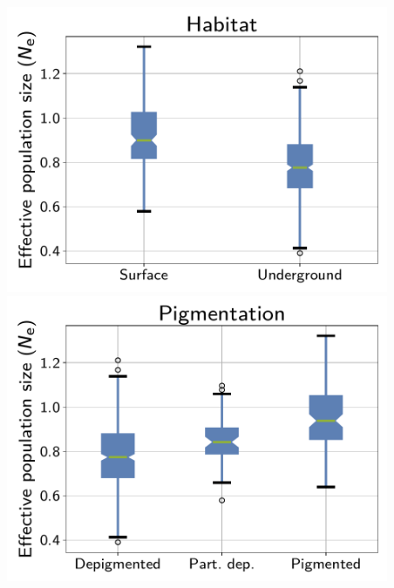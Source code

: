 \documentclass{article}
\providecommand{\DIFaddbeginFL}{} %
\providecommand{\DIFaddendFL}{} %
\providecommand{\DIFdelbeginFL}{} %
\providecommand{\DIFdelendFL}{} %
\begin{document}
    \begin{figure}[t]
        \centering
        \begin{minipage}{0.32\linewidth}
            \includegraphics[width=\linewidth, page=1]{isopods/12CDS_SiteMutSelBranchNe_Rep_LogPopulationSize_eco_merged}
        \end{minipage} \hfill
        \DIFdelbeginFL %
\DIFdelendFL \DIFaddbeginFL {}\hfill
        \DIFaddendFL \hfill
        \begin{minipage}{0.32\linewidth}
            \includegraphics[width=\linewidth, page=1]{isopods/12CDS_SiteMutSelBranchNe_Rep_LogPopulationSize_pig_merged}

\end{minipage}
\end{figure}
\end{document}
